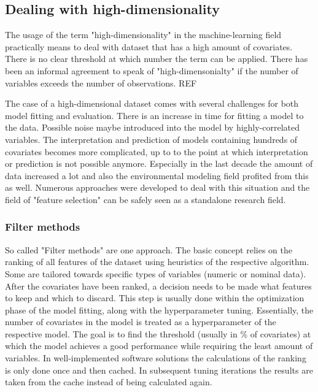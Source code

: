 \documentclass[review]{elsarticle}
\begin{document}
\subsection{Dealing with high-dimensionality}
The usage of the term "high-dimensionality" in the machine-learning field practically means to deal with dataset that has a high amount of covariates.
There is no clear threshold at which number the term can be applied.
There has been an informal agreement to speak of "high-dimensonialty" if the number of variables exceeds the number of observations. REF

The case of a high-dimensional dataset comes with several challenges for both model fitting and evaluation.
There is an increase in time for fitting a model to the data.
Possible noise maybe introduced into the model by highly-correlated variables.
The interpretation and prediction of models containing hundreds of covariates becomes more complicated, up to to the point at which interpretation or prediction is not possible anymore.
Especially in the last decade the amount of data increased a lot and also the environmental modeling field profited from this as well.
Numerous approaches were developed to deal with this situation and the field of "feature selection" can be safely seen as a standalone research field.

\subsubsection{Filter methods}

So called "Filter methods" are one approach.
The basic concept relies on the ranking of all features of the dataset using heuristics of the respective algorithm.
Some are tailored towards specific types of variables (numeric or nominal data).
After the covariates have been ranked, a decision needs to be made what features to keep and which to discard.
This step is usually done within the optimization phase of the model fitting, along with the hyperparameter tuning.
Essentially, the number of covariates in the model is treated as a hyperparameter of the respective model.
The goal is to find the threshold (usually in \% of covariates) at which the model achieves a good performance while requiring the least amount of variables.
In well-implemented software solutions the calculations of the ranking is only done once and then cached.
In subsequent tuning iterations the results are taken from the cache instead of being calculated again.
\end{document}
